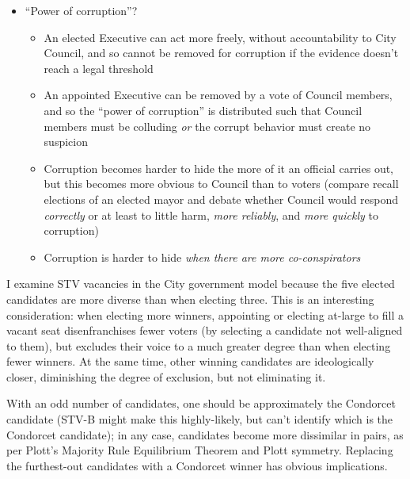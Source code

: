 \begin{itemize}
\begin{itemize}
\begin{itemize}
            \item ``Power of corruption''?
            \begin{itemize}
                \item An elected Executive can act more freely, without accountability to City Council, and so cannot be removed for corruption if the evidence doesn't reach a legal threshold

                \item An appointed Executive can be removed by a vote of Council members, and so the ``power of corruption'' is distributed such that Council members must be colluding \textit{or} the corrupt behavior must create no suspicion

                \item Corruption becomes harder to hide the more of it an official carries out, but this becomes more obvious to Council than to voters (compare recall elections of an elected mayor and debate whether Council would respond \textit{correctly} or at least to little harm, \textit{more reliably}, and \textit{more quickly} to corruption)

                \item Corruption is harder to hide \textit{when there are more co-conspirators}
            \end{itemize}
        \end{itemize}
    \end{itemize}
\end{itemize}

\begin{boxcomment}
    I examine STV vacancies in the City government model because the five elected candidates are more diverse than when electing three.  This is an interesting consideration:  when electing more winners, appointing or electing at-large to fill a vacant seat disenfranchises fewer voters (by selecting a candidate not well-aligned to them), but excludes their voice to a much greater degree than when electing fewer winners.  At the same time, other winning candidates are ideologically closer, diminishing the degree of exclusion, but not eliminating it.

    With an odd number of candidates, one should be approximately the Condorcet candidate (STV-B might make this highly-likely, but can't identify which is the Condorcet candidate); in any case, candidates become more dissimilar in pairs, as per Plott's Majority Rule Equilibrium Theorem and Plott symmetry.  Replacing the furthest-out candidates with a Condorcet winner has obvious implications.
\end{boxcomment}